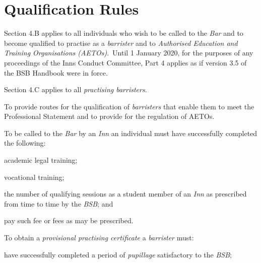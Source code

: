\part{Qualification Rules}



Section 4.B applies to all individuals who wish to be called to the
\emph{Bar} and to become qualified to practise as a \emph{barrister} and
to \emph{Authorised Education and Training Organisations (AETOs)}.~Until
1 January 2020, for the purposes of any proceedings of the Inns Conduct
Committee, Part 4 applies as if version 3.5 of the BSB Handbook were in
force.


Section 4.C applies to all \emph{practising barristers}.







To provide routes for the qualification of \emph{barristers} that enable
them to meet the Professional Statement and to provide for the
regulation of AETOs.




To be called to the \emph{Bar} by an \emph{Inn} an individual must have
successfully completed the following:

\nl\item academic legal training;

\item vocational training;

\item the number of qualifying sessions as a student member of an
\emph{Inn} as prescribed from time to time by the \emph{BSB}; and

\item pay such fee or fees as may be prescribed.\ln


To obtain a \emph{provisional practising certificate} a \emph{barrister}
must:
\nl
\item have successfully completed a period of \emph{pupillage} satisfactory
to the \emph{BSB};

